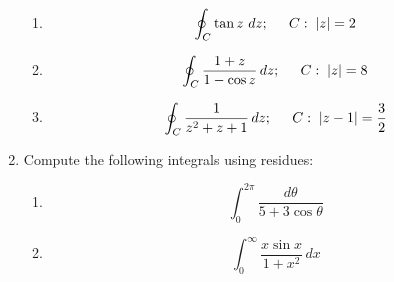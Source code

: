 \documentclass[fleqn]{article}
\begin{document}
\begin{enumerate}
\begin{enumerate}
      \item \[
      \oint_{C}\tan z\,\,dz;\hspace{0.2in}C:\;\left| z\right| =2
      \]
      
      \item \[
      \oint_{C}\frac{1+z}{1-\cos z}\,dz;\hspace{0.2in}C:\;\left| z\right| =8
      \]
      
      \item \[
      \oint_{C}\frac{1}{z^{2}+z+1}\,dz;\hspace{0.2in}C:\;\left| z-1\right| =\frac{3}{2}
      \]
    \end{enumerate}
    
    \item Compute the following integrals using residues:
    
    \begin{enumerate}
      \item \[
      \int_{0}^{2\pi }\frac{d\theta }{5+3\cos \theta }
      \]
      
      \item \[
      \int_{0}^{\infty }\frac{x\sin x}{1+x^{2}}\,dx
      \]
    \end{enumerate}
    
  
    \end{enumerate}
\end{document}
